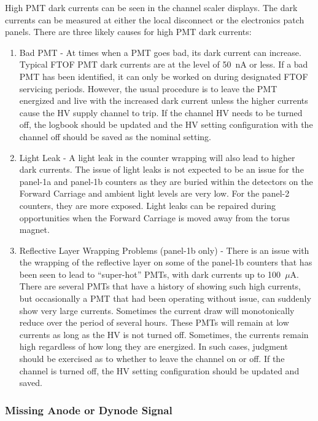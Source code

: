 \documentclass[letterpaper,10pt]{article}
\begin{document}
High PMT dark currents can be seen in the channel scaler displays. The dark currents can be measured
at either the local disconnect or the electronics patch panels. There are three likely causes for high 
PMT dark currents:

\begin{enumerate}
\item Bad PMT - At times when a PMT goes bad, its dark current can increase. Typical FTOF PMT dark 
currents are at the level of 50~nA or less. If a bad PMT has been identified, it can only be worked 
on during designated FTOF servicing periods. However, the usual procedure is to leave the PMT 
energized and live with the increased dark current unless the higher currents cause the HV supply 
channel to trip. If the channel HV needs to be turned off, the logbook should be updated and the HV 
setting configuration with the channel off should be saved as the nominal setting.
\item Light Leak - A light leak in the counter wrapping will also lead to higher dark currents. The 
issue of light leaks is not expected to be an issue for the panel-1a and panel-1b counters as they 
are buried within the detectors on the Forward Carriage and ambient light levels are very low. For 
the panel-2 counters, they are more exposed. Light leaks can be repaired during opportunities when 
the Forward Carriage is moved away from the torus magnet.
\item Reflective Layer Wrapping Problems (panel-1b only) - There is an issue with the wrapping of 
the reflective layer on some of the panel-1b counters that has been seen to lead to ``super-hot'' PMTs, 
with dark currents up to 100~$\mu$A. There are several PMTs that have a history of showing such high 
currents, but occasionally a PMT that had been operating without issue, can suddenly show very large 
currents. Sometimes the current draw will monotonically reduce over the period of several hours. These 
PMTs will remain at low currents as long as the HV is not turned off. Sometimes, the currents remain 
high regardless of how long they are energized. In such cases, judgment should be exercised as to 
whether to leave the channel on or off. If the channel is turned off, the HV setting configuration 
should be updated and saved.
\end{enumerate}

\subsubsection{Missing Anode or Dynode Signal}
\label{missing}
\end{document}
